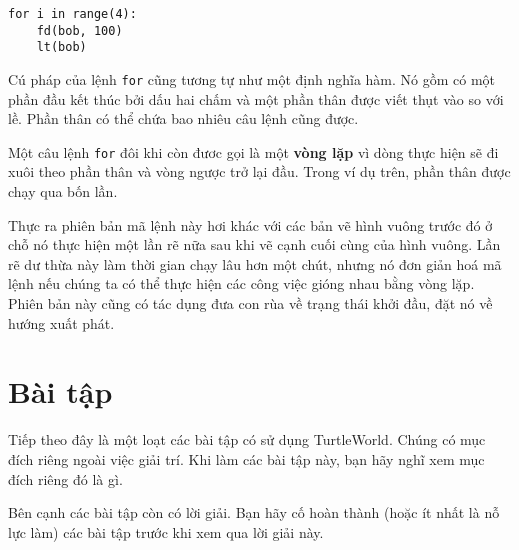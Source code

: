 \documentclass[11pt]{book}
\begin{document}
\beforeverb
\begin{verbatim}
for i in range(4):
    fd(bob, 100)
    lt(bob)
\end{verbatim}
\afterverb
%
Cú pháp của lệnh {\tt for} cũng tương tự như một định nghĩa hàm.
Nó gồm có một phần đầu kết thúc bởi dấu hai chấm và một phần 
thân được viết thụt vào so với lề. Phần thân có thể chứa bao nhiêu
câu lệnh cũng được.


Một câu lệnh {\tt for} đôi khi còn đươc gọi là một {\bf vòng lặp} vì
dòng thực hiện sẽ đi xuôi theo phần thân và vòng ngược trở lại đầu.
Trong ví dụ trên, phần thân được chạy qua bốn lần.

Thực ra phiên bản mã lệnh này hơi khác với các bản vẽ hình vuông 
trước đó ở chỗ nó thực hiện một lần rẽ nữa sau khi vẽ cạnh cuối cùng
của hình vuông. Lần rẽ dư thừa này làm thời gian chạy lâu hơn một chút,
nhưng nó đơn giản hoá mã lệnh nếu chúng ta có thể thực hiện các
công việc gióng nhau bằng vòng lặp. Phiên bản này cũng có tác dụng
đưa con rùa về trạng thái khởi đầu, đặt nó về hướng xuất phát.


\section{Bài tập}

Tiếp theo đây là một loạt các bài tập có sử dụng TurtleWorld. Chúng
có mục đích riêng ngoài việc giải trí. Khi làm các bài tập này, bạn
hãy nghĩ xem mục đích riêng đó là gì.

Bên cạnh các bài tập còn có lời giải. Bạn hãy cố hoàn thành (hoặc
ít nhất là nỗ lực làm) các bài tập trước khi xem qua lời giải này.
\end{document}
